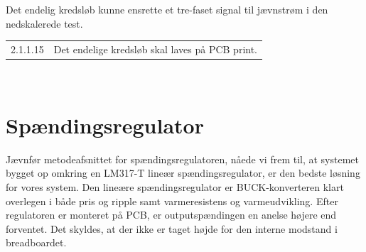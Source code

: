 Det endelig kredsløb kunne ensrette et tre-faset signal til jævnstrøm i den nedskalerede test.\\



\vspace{1em}
\begin{tabular}[h]{ll}
2.1.1.15&Det endelige kredsløb skal laves på PCB print.\vspace{0.5em}\\
\end{tabular}
\vspace{1em}\\



\section{Spændingsregulator}
\label{sec:spandingsregulator}


Jævnfør metodeafsnittet for spændingsregulatoren, nåede vi frem til, at systemet bygget op omkring en LM317-T lineær spændingsregulator, er den bedste løsning for vores system. Den lineære spændingsregulator er BUCK-konverteren klart overlegen i både pris og ripple samt varmeresistens og varmeudvikling. Efter regulatoren er monteret på PCB, er outputspændingen en anelse højere end forventet. Det skyldes, at der ikke er taget højde for den interne modstand i breadboardet. 

